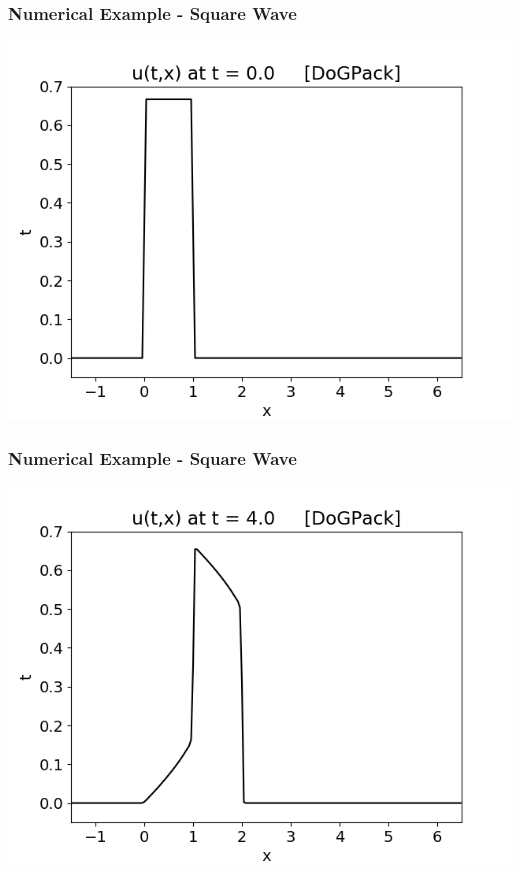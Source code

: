 \documentclass[10pt]{beamer}
\begin{document}
    \begin{frame}
      \frametitle{Numerical Example - Square Wave}
      \begin{center}
        \includegraphics[scale=0.6]{Figures/squarewave00.png}
      \end{center}
    \end{frame}
    \begin{frame}
      \frametitle{Numerical Example - Square Wave}
      \begin{center}
        \includegraphics[scale=0.5]{Figures/squarewave04.png}
      \end{center}
    \end{frame}
\end{document}
